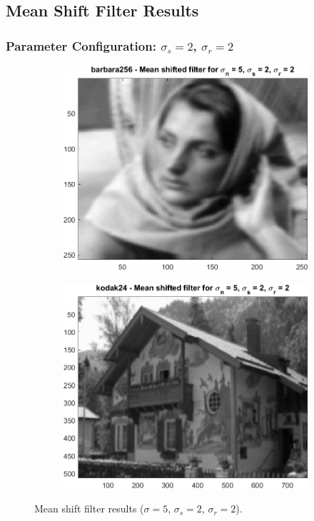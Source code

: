 \documentclass{article}
\begin{document}
\subsection{Mean Shift Filter Results}
\subsubsection{Parameter Configuration: $\sigma_s = 2$, $\sigma_r = 2$}
\begin{figure}[H]
    \centering
    \begin{subfigure}[b]{0.45\textwidth}
        \includegraphics[width=\textwidth]{../images/barbara_5_2_2.png}
    \end{subfigure}
    \begin{subfigure}[b]{0.45\textwidth}
        \includegraphics[width=\textwidth]{../images/kodak_5_2_2.png}
    \end{subfigure}
    \caption{Mean shift filter results ($\sigma = 5$, $\sigma_s = 2$, $\sigma_r = 2$).}
\end{figure}
\end{document}
